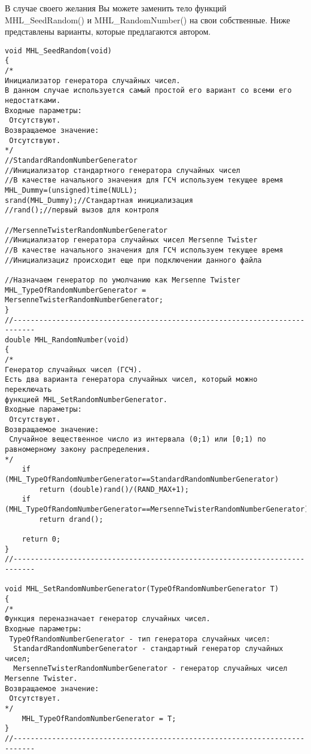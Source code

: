 В случае своего желания Вы можете заменить тело функций MHL\_SeedRandom() и MHL\_RandomNumber() на свои собственные. Ниже представлены варианты, которые предлагаются автором.

\begin{lstlisting}[label=random_standard,caption=Стандартный вариант по умолчанию]
void MHL_SeedRandom(void)
{
/*
Инициализатор генератора случайных чисел.
В данном случае используется самый простой его вариант со всеми его недостатками.
Входные параметры:
 Отсутствуют.
Возвращаемое значение:
 Отсутствуют.
*/
//StandardRandomNumberGenerator
//Инициализатор стандартного генератора случайных чисел
//В качестве начального значения для ГСЧ используем текущее время
MHL_Dummy=(unsigned)time(NULL);
srand(MHL_Dummy);//Стандартная инициализация
//rand();//первый вызов для контроля

//MersenneTwisterRandomNumberGenerator
//Инициализатор генератора случайных чисел Mersenne Twister
//В качестве начального значения для ГСЧ используем текущее время
//Инициализациz происходит еще при подключении данного файла

//Назначаем генератор по умолчанию как Mersenne Twister
MHL_TypeOfRandomNumberGenerator = MersenneTwisterRandomNumberGenerator;
}
//---------------------------------------------------------------------------
double MHL_RandomNumber(void)
{
/*
Генератор случайных чисел (ГСЧ).
Есть два варианта генератора случайных чисел, который можно переключать
функцией MHL_SetRandomNumberGenerator.
Входные параметры:
 Отсутствуют.
Возвращаемое значение:
 Случайное вещественное число из интервала (0;1) или [0;1) по равномерному закону распределения.
*/
    if (MHL_TypeOfRandomNumberGenerator==StandardRandomNumberGenerator)
        return (double)rand()/(RAND_MAX+1);
    if (MHL_TypeOfRandomNumberGenerator==MersenneTwisterRandomNumberGenerator)
        return drand();

    return 0;
}
//---------------------------------------------------------------------------

void MHL_SetRandomNumberGenerator(TypeOfRandomNumberGenerator T)
{
/*
Функция переназначает генератор случайных чисел.
Входные параметры:
 TypeOfRandomNumberGenerator - тип генератора случайных чисел:
  StandardRandomNumberGenerator - стандартный генератор случайных чисел;
  MersenneTwisterRandomNumberGenerator - генератор случайных чисел Mersenne Twister.
Возвращаемое значение:
 Отсутствует.
*/
    MHL_TypeOfRandomNumberGenerator = T;
}
//---------------------------------------------------------------------------
\end{lstlisting}

